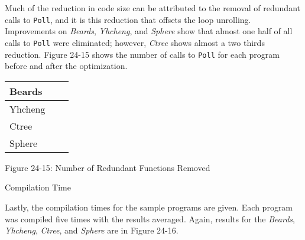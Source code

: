 Much of the reduction in code size can be attributed to the removal of
redundant calls to \texttt{Poll}, and it is this reduction that
offsets the loop unrolling. Improvements on \textit{Beards},
\textit{Yhcheng}, and \textit{Sphere} show that almost one half of all
calls to \texttt{Poll} were eliminated; however, \textit{Ctree} shows
almost a two thirds reduction. Figure 24-15 shows the number of calls
to \texttt{Poll} for each program before and after the optimization.

\begin{center}
\tabletail{}
\tablelasttail{}
\begin{xtabular}{|m{0.9406598in}|m{0.76435983in}|m{0.6712598in}|}
\hline
 Beards &
 &
\raggedleft{}\\\hline
 Yhcheng &
 &
\raggedleft{}\\\hline
 Ctree &
 &
\raggedleft{}\\\hline
 Sphere &
 &
\raggedleft{}\\\hline
\end{xtabular}
\end{center}
{\centering{}
Figure 24-15: Number of Redundant Functions Removed
\par}

{\sffamily
Compilation Time}

Lastly, the compilation times for the sample programs are given. Each
program was compiled five times with the results averaged. Again,
results for the \textit{Beards}, \textit{Yhcheng}, \textit{Ctree}, and
\textit{Sphere} are in Figure 24-16.

